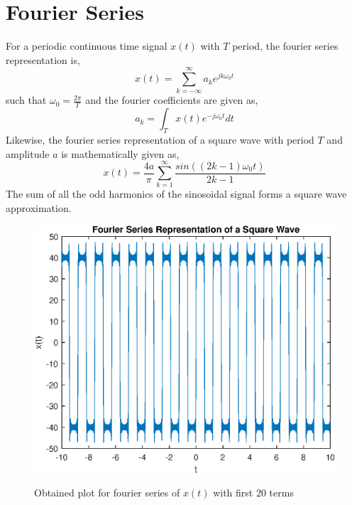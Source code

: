 \documentclass{lab_sheet}
\begin{document}
    \section{Fourier Series}
    For a periodic continuous time signal $x(t)$ with $T$ period, the fourier series representation is,
    $$
    x(t)=\sum_{k=-\infty}^{\infty}a_k e^{jk\omega_0 t}
    $$
    such that $\omega_0 = \frac{2\pi}{T}$ and the fourier coefficients are given as,
    $$
    a_k = \int_T x(t) e^{-j \omega_0 t}dt
    $$
    Likewise, the fourier series representation of a square wave with period $T$ and amplitude $a$ is mathematically given as,
    $$
    x(t)=\frac{4a}{\pi} \sum_{k=1}^{\infty}\frac{sin((2k-1)\omega_0 t)}{2k-1}
    $$
    The sum of all the odd harmonics of the sinosoidal signal forms a square wave approximation.
        \begin{figure}[H]
        \centering
        \includegraphics[scale=0.7]{./Figures/sin_add_odd_1}
        \label{fig:sin1}
        \caption{Obtained plot for fourier series of $x(t)$ with first 20 terms}
    \end{figure}
\end{document}
